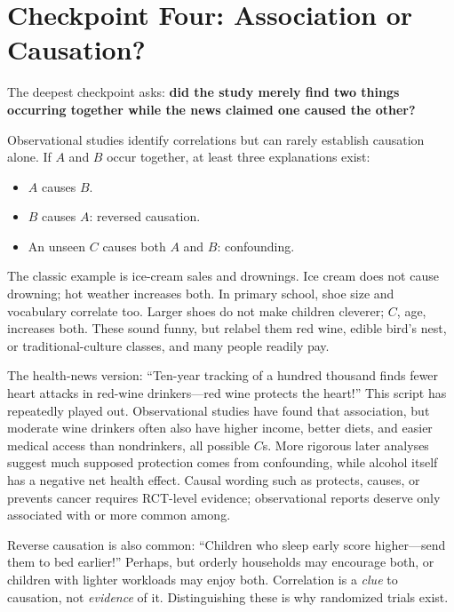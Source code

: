 \section{Checkpoint Four: Association or Causation?}

The deepest checkpoint asks: \textbf{did the study merely find two things occurring together while the news claimed one caused the other?}

Observational studies identify correlations but can rarely establish causation alone. If $A$ and $B$ occur together, at least three explanations exist:

\begin{itemize}[itemsep=2pt]
\item $A$ causes $B$.
\item $B$ causes $A$: reversed causation.
\item An unseen $C$ causes both $A$ and $B$: confounding.
\end{itemize}

The classic example is ice-cream sales and drownings. Ice cream does not cause drowning; hot weather increases both. In primary school, shoe size and vocabulary correlate too. Larger shoes do not make children cleverer; $C$, age, increases both. These sound funny, but relabel them red wine, edible bird's nest, or traditional-culture classes, and many people readily pay.

The health-news version: ``Ten-year tracking of a hundred thousand finds fewer heart attacks in red-wine drinkers---red wine protects the heart!'' This script has repeatedly played out. Observational studies have found that association, but moderate wine drinkers often also have higher income, better diets, and easier medical access than nondrinkers, all possible $C$s. More rigorous later analyses suggest much supposed protection comes from confounding, while alcohol itself has a negative net health effect. Causal wording such as protects, causes, or prevents cancer requires RCT-level evidence; observational reports deserve only associated with or more common among.

Reverse causation is also common: ``Children who sleep early score higher---send them to bed earlier!'' Perhaps, but orderly households may encourage both, or children with lighter workloads may enjoy both. Correlation is a \emph{clue} to causation, not \emph{evidence} of it. Distinguishing these is why randomized trials exist.

